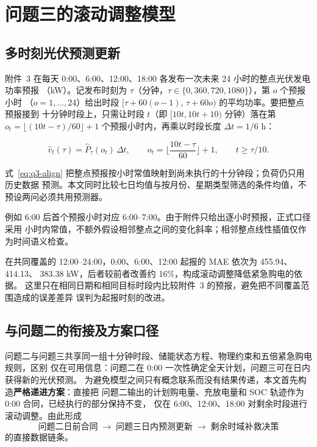 \documentclass[withoutpreface,bwprint]{cumcmthesis}
\begin{document}

\section{问题三的滚动调整模型}
\label{sec:q3}

\subsection{多时刻光伏预测更新}

附件~3 在每天 0:00、6:00、12:00、18:00 各发布一次未来 24 小时的整点光伏发电功率预报
（kW）。记发布时刻为 $\tau$（分钟，$\tau\in\{0,360,720,1080\}$），第 $o$ 个预报小时
（$o=1,\dots,24$）给出时段 $[\tau+60(o-1),\,\tau+60o)$ 的平均功率。要把整点预报接到
十分钟时段上，只需让时段 $t$（即 $[10t,10t+10)$ 分钟）落在第
$o_t=\lfloor(10t-\tau)/60\rfloor+1$ 个预报小时内，再乘以时段长度 $\Delta t=1/6$ h：

\begin{equation}
  \widehat v_t(\tau)=\widehat P_{\tau}(o_t)\,\Delta t,\qquad
  o_t=\Big\lfloor\frac{10t-\tau}{60}\Big\rfloor+1,\qquad t\ge \tau/10 .
  \label{eq:q3-align}
\end{equation}

式~\eqref{eq:q3-align} 把整点预报按小时常值映射到尚未执行的十分钟段；负荷仍只用历史数据
预测。本文同时比较七日均值与按月份、星期类型筛选的条件均值，不预设两问必须共用预测器。

例如 6:00 后首个预报小时对应 6:00--7:00。由于附件只给出逐小时预报，正式口径采用
小时内常值，不额外假设相邻整点之间的变化斜率；相邻整点线性插值仅作为时间语义检查。

在共同覆盖的 12:00--24:00，0:00、6:00、12:00 起报的 MAE 依次为 455.94、414.13、
383.38 kW，后者较前者改善约 16\%，构成滚动调整降低紧急购电的依据。
这里只在相同日期和相同目标时段内比较附件~3 的预报，避免把不同覆盖范围造成的误差差异
误判为起报时刻的改进。

\subsection{与问题二的衔接及方案口径}

问题二与问题三共享同一组十分钟时段、储能状态方程、物理约束和五倍紧急购电规则，区别
仅在可用信息：问题二在 0:00 一次性确定全天计划，问题三可在日内获得新的光伏预测。
为避免模型之间只有概念联系而没有结果传递，本文首先构造\textbf{严格递进方案}：直接把
问题二输出的计划购电量、充放电量和 SOC 轨迹作为 0:00 合同，已经执行的部分保持不变，
仅在 6:00、12:00、18:00 对剩余时段进行滚动调整。由此形成
\[
  \text{问题二日前合同}\;\longrightarrow\;
  \text{问题三日内预测更新}\;\longrightarrow\;
  \text{剩余时域补救决策}
\]
的直接数据链条。
\end{document}
